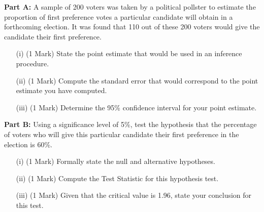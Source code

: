 \documentclass[]{article}
\begin{document}
\textbf{Part A:} A sample of 200 voters was taken by a political pollster to estimate the proportion of first preference votes a 
particular candidate will obtain in a forthcoming election. 
It was found that 110 out of these 200 voters would give the candidate their first preference.


\begin{itemize}
\item[(i)] (1 Mark) State the point estimate that would be used in an inference procedure.
\item[(ii)] (1 Mark) Compute the standard error that would correspond to the point estimate you have computed.
\item[(iii)] (1 Mark) Determine the 95\% confidence interval for your point estimate.
\end{itemize}

\noindent \textbf{Part B:} Using a significance level of 5\%, test the hypothesis that the percentage of voters who will give this 
particular candidate their first preference in the election is 60\%.{\tiny } 

\begin{itemize}
\item[(i)] (1 Mark) Formally state the null and alternative hypotheses.
\item[(ii)] (1 Mark) Compute the Test Statistic for this hypothesis test.
\item[(iii)] (1 Mark) Given that the critical value is 1.96, state your conclusion for this test.
\end{itemize}
\end{document}
